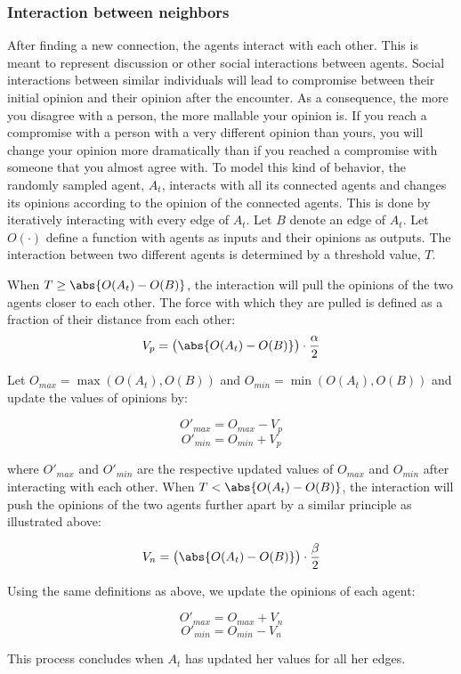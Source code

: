\documentclass{article}
\DeclarePairedDelimiter{\abs}\lvert\rvert
\begin{document}
\subsubsection{Interaction between neighbors}
After finding a new connection, the agents interact with each other. This is meant to represent 
discussion or other social interactions between agents. 
Social interactions between similar individuals will lead to compromise between their initial opinion and their opinion after the encounter.
As a consequence, the more you disagree with a person, the more mallable your opinion is. If you reach a compromise with a person with a very different opinion than yours,
you will change your opinion more dramatically than if you reached a compromise with someone that you almost agree with. 
To model this kind of behavior, the randomly sampled agent, $A_t$, interacts with all its connected agents and changes its opinions according to the opinion of the connected agents.
This is done by iteratively interacting with every edge of $A_t$. Let $B$ denote an edge of $A_t$. Let $O(\cdot)$ define a function with agents as inputs and their opinions as outputs.
The interaction between two different agents is determined by a threshold value, $T$. 

When $T \geq \abs{O(A_t) - O(B)}$, the interaction will pull the opinions of the two agents closer to each other. The force with which they are pulled is defined as a fraction of their distance from each other:
$$V_p = \big(\abs{O(A_t) - O(B)}\big) \cdot \frac{\alpha}{2}$$

Let $O_{max} = \max(O(A_t), O(B))$ and $O_{min} = \min(O(A_t), O(B))$ and update the values of opinions by:

$$O'_{max} = O_{max} - V_p$$
$$O'_{min} = O_{min} + V_p$$

where $O'_{max}$ and $O'_{min}$ are the respective updated values of $O_{max}$ and $O_{min}$ after interacting with each other. When $T < \abs{O(A_t) - O(B)}$, the interaction will push the opinions of the two agents further apart by a similar principle as illustrated above: 

$$V_n = \big(\abs{O(A_t) - O(B)}\big) \cdot \frac{\beta}{2}$$

Using the same definitions as above, we update the opinions of each agent:

$$O'_{max} = O_{max} + V_n$$
$$O'_{min} = O_{min} - V_n$$

This process concludes when $A_t$ has updated her values for all her edges.
\end{document}
